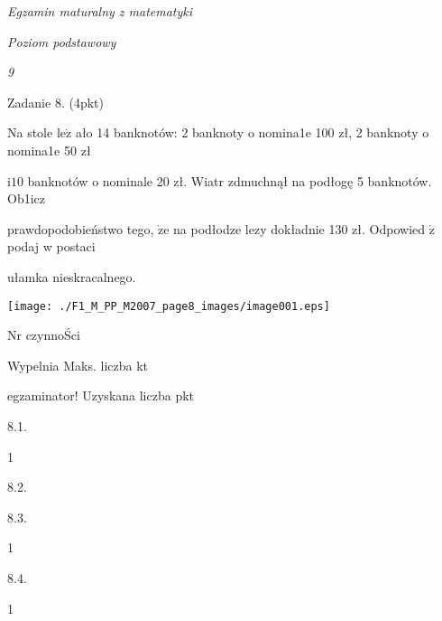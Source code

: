 \documentclass[a4paper,12pt]{article}
\begin{document}
{\it Egzamin maturalny z matematyki}

{\it Poziom podstawowy}

{\it 9}

Zadanie 8. (4pkt)

Na stole $\mathrm{l}\mathrm{e}\dot{\mathrm{z}}$ ało 14 banknotów: 2 banknoty o nomina1e 100 zł, 2 banknoty o nomina1e 50 zł

$\mathrm{i} 10$ banknotów o nominale 20 zł. Wiatr zdmuchnął na podłogę 5 banknotów. Ob1icz

prawdopodobieństwo tego, $\dot{\mathrm{z}}\mathrm{e}$ na podłodze lezy dokładnie 130 zł. Odpowied $\acute{\mathrm{z}}$ podaj w postaci

ułamka nieskracalnego.
\begin{center}
\texttt{[image: ./F1\_M\_PP\_M2007\_page8\_images/image001.eps]}
\end{center}
Nr czynnoŚci

Wypelnia Maks. liczba kt

egzaminator! Uzyskana liczba pkt

8.1.

1

8.2.

8.3.

1

8.4.

1
\end{document}
